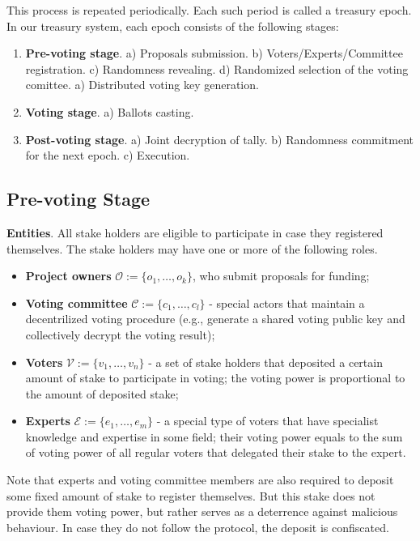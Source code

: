 This process is repeated periodically. Each such period is called a treasury epoch. In our treasury system, each epoch consists of the following stages:
\begin{enumerate}[leftmargin=5em, itemsep=0em]
    \item \textbf{Pre-voting stage}.
        \subitem a) Proposals submission.
        \subitem b) Voters/Experts/Committee registration.
        \subitem c) Randomness revealing.
        \subitem d) Randomized selection of the voting comittee.
        \subitem a) Distributed voting key generation.
    \item \textbf{Voting stage}.
        \subitem a) Ballots casting.
    \item \textbf{Post-voting stage}.
        \subitem a) Joint decryption of tally.
        \subitem b) Randomness commitment for the next epoch.
        \subitem c) Execution.
\end{enumerate}

\subsection{Pre-voting Stage}
\textbf{Entities}. All stake holders are eligible to participate in case they registered themselves. The stake holders may have one or more of the following roles.
\begin{itemize}[leftmargin=5em, itemsep=0em]
    \item \textbf{Project owners} $\mathcal{O}:=\{o_1,\ldots, o_k \}$, who submit proposals for funding;
    \item \textbf{Voting committee} $\mathcal{C}:=\{c_1,\ldots, c_l \}$ - special actors that maintain a decentrilized voting procedure (e.g., generate a shared voting public key and collectively decrypt the voting result);
    \item \textbf{Voters} $\mathcal{V}:=\{v_1,\ldots, v_n \}$ - a set of stake holders that deposited a certain amount of stake to participate in voting; the voting power is proportional to the amount of deposited stake;
    \item \textbf{Experts} $\mathcal{E}:=\{e_1,\ldots, e_m \}$ - a special type of voters that have specialist knowledge and expertise in some field; their voting power equals to the sum of voting power of all regular voters that delegated their stake to the expert.
\end{itemize}
Note that experts and voting committee members are also required to deposit some fixed amount of stake to register themselves. But this stake does not provide them voting power, but rather serves as a deterrence against malicious behaviour. In case they do not follow the protocol, the deposit is confiscated.
	
